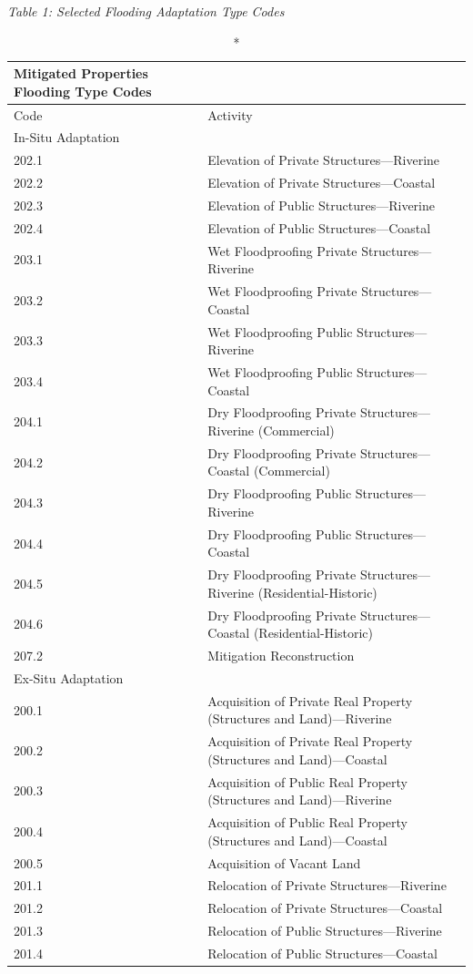 \documentclass[
  12pt,
]{article}
\begin{document}
\newpage

\emph{Table 1: Selected Flooding Adaptation Type Codes}\\
\captionsetup[table]{labelformat=empty,skip=1pt}
\setlength{\LTpost}{0mm}

\begin{longtable}{ll}
\caption*{
{\large Mitigated Properties Flooding Type Codes}
} \\ 
\toprule
Code & Activity \\ 
\midrule
\multicolumn{1}{l}{In-Situ Adaptation} \\ 
\midrule
202.1 & Elevation of Private Structures—Riverine \\ 
202.2 & Elevation of Private Structures—Coastal \\ 
202.3 & Elevation of Public Structures—Riverine \\ 
202.4 & Elevation of Public Structures—Coastal \\ 
203.1 & Wet Floodproofing Private Structures—Riverine \\ 
203.2 & Wet Floodproofing Private Structures—Coastal \\ 
203.3 & Wet Floodproofing Public Structures—Riverine \\ 
203.4 & Wet Floodproofing Public Structures—Coastal \\ 
204.1 & Dry Floodproofing Private Structures—Riverine (Commercial) \\ 
204.2 & Dry Floodproofing Private Structures—Coastal (Commercial) \\ 
204.3 & Dry Floodproofing Public Structures—Riverine \\ 
204.4 & Dry Floodproofing Public Structures—Coastal \\ 
204.5 & Dry Floodproofing Private Structures—Riverine (Residential-Historic) \\ 
204.6 & Dry Floodproofing Private Structures—Coastal (Residential-Historic) \\ 
207.2 & Mitigation Reconstruction \\ 
\midrule
\multicolumn{1}{l}{Ex-Situ Adaptation} \\ 
\midrule
200.1 & Acquisition of Private Real Property (Structures and Land)—Riverine \\ 
200.2 & Acquisition of Private Real Property (Structures and Land)—Coastal \\ 
200.3 & Acquisition of Public Real Property (Structures and Land)—Riverine \\ 
200.4 & Acquisition of Public Real Property (Structures and Land)—Coastal \\ 
200.5 & Acquisition of Vacant Land \\ 
201.1 & Relocation of Private Structures—Riverine \\ 
201.2 & Relocation of Private Structures—Coastal \\ 
201.3 & Relocation of Public Structures—Riverine \\ 
201.4 & Relocation of Public Structures—Coastal \\ 
\bottomrule
\end{longtable}
\end{document}
